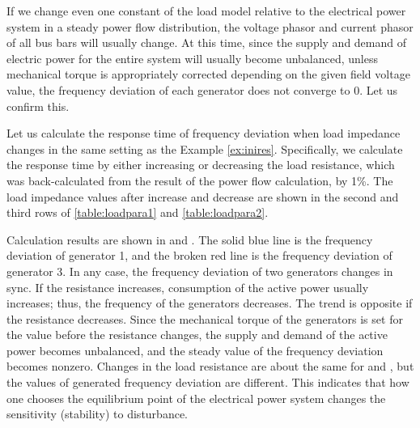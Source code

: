 \documentclass[tombow,dvipdfmx]{corona-a5-1.1}
\begin{document}
If we change even one constant of the load model relative to the electrical power system in a steady power flow distribution, the voltage phasor and current phasor of all bus bars will usually change.
At this time, since the supply and demand of electric power for the entire system will usually become unbalanced, unless mechanical torque is appropriately corrected depending on the given field voltage value, the frequency deviation of each generator does not converge to 0.
Let us confirm this.

\begin{例}\label{ex:loadpv}
Let us calculate the response time of frequency deviation when load impedance changes in the same setting as the Example \ref{ex:inires}.
Specifically, we calculate the response time by either increasing or decreasing the load resistance, which was back-calculated from the result of the power flow calculation, by 1\%.
The load impedance values after increase and decrease are shown in the second and third rows of \ref{table:loadpara1} and \ref{table:loadpara2}.

Calculation results are shown in  and .
The solid blue line is the frequency deviation of generator 1, and the broken red line is the frequency deviation of generator 3.
In any case, the frequency deviation of two generators changes in sync. If the resistance increases, consumption of the active power usually increases; thus, the frequency of the generators decreases.
The trend is opposite if the resistance decreases. Since the mechanical torque of the generators is set for the value before the resistance changes, the supply and demand of the active power becomes unbalanced, and the steady value of the frequency deviation becomes nonzero.
Changes in the load resistance are about the same for  and , but the values of generated frequency deviation are different.
This indicates that how one chooses the equilibrium point of the electrical power system changes the sensitivity (stability) to disturbance.

\end{例}
\end{document}
